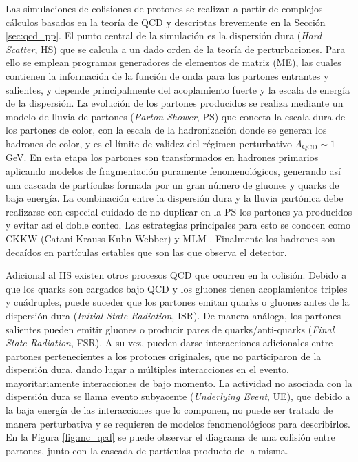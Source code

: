 Las simulaciones de colisiones de protones se realizan a partir de complejos cálculos basados en la teoría de QCD y descriptas brevemente en la Sección \ref{sec:qcd_pp}. 
El punto central de la simulación es la dispersión dura (\textit{Hard Scatter}, HS) que se calcula a un dado orden de la teoría de perturbaciones. Para ello se emplean programas generadores de elementos de matriz (ME), las cuales contienen  la información de la función de onda para los partones entrantes y salientes, y depende principalmente del acoplamiento
fuerte y la escala de energía de la dispersión. La evolución de los partones producidos se realiza mediante un modelo de lluvia de partones (\textit{Parton Shower}, PS) que conecta la escala dura de los partones de color, con la escala de la hadronización donde se generan los hadrones de color, y es el límite de validez del régimen perturbativo $\Lambda_{\text{QCD}}\sim 1$\,GeV. En esta etapa los partones son transformados en hadrones primarios aplicando modelos de fragmentación puramente fenomenológicos, generando así una cascada de partículas formada por un gran número de gluones y quarks de baja energía. La combinación entre la dispersión dura y la lluvia partónica debe realizarse
con especial cuidado de no duplicar en la PS los partones ya producidos y evitar
así el doble conteo. Las estrategias principales para esto se conocen como CKKW
(Catani-Krauss-Kuhn-Webber) \cite{ckkw_1, ckkw_2} y MLM \cite{mlm}. Finalmente los hadrones son decaídos en partículas estables que son las que observa el detector.

Adicional al HS existen otros procesos QCD que ocurren en la colisión. Debido a que los quarks son cargados bajo QCD y los gluones tienen acoplamientos triples y cuádruples, puede suceder que los partones emitan quarks o gluones antes de la dispersión dura (\textit{Initial State Radiation}, ISR). De manera análoga, los partones salientes pueden emitir gluones o
producir pares de quarks/anti-quarks (\textit{Final State Radiation}, FSR). A su vez, pueden darse interacciones adicionales entre partones pertenecientes a los protones originales, que no participaron de la dispersión dura, dando lugar a múltiples
interacciones en el evento, mayoritariamente interacciones de bajo momento. La actividad no asociada con la dispersión dura se llama evento subyacente
(\textit{Underlying Event}, UE), que debido a la baja energía de las interacciones que lo
componen, no puede ser tratado de manera perturbativa y se requieren de modelos
fenomenológicos para describirlos. En la Figura \ref{fig:mc_qcd} se puede observar el diagrama de una colisión entre partones, junto con la cascada de partículas producto de la misma.

